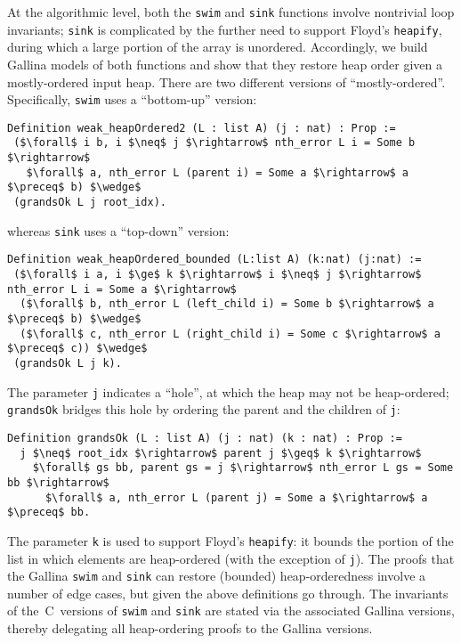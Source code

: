 At the algorithmic level, both the \texttt{swim} and \texttt{sink} functions involve nontrivial loop invariants; \texttt{sink} is complicated by the further need to support Floyd's \texttt{heapify}, during which a large portion of the array is unordered.  Accordingly, we build Gallina models of both functions and show that they restore heap order given a mostly-ordered input heap.  There are two different versions of ``mostly-ordered''. Specifically, \texttt{swim} uses a ``bottom-up'' version:
\begin{lstlisting}[firstnumber=5]
Definition weak_heapOrdered2 (L : list A) (j : nat) : Prop :=
 ($\forall$ i b, i $\neq$ j $\rightarrow$ nth_error L i = Some b $\rightarrow$
   $\forall$ a, nth_error L (parent i) = Some a $\rightarrow$ a $\preceq$ b) $\wedge$
 (grandsOk L j root_idx).
\end{lstlisting}
whereas \texttt{sink} uses a ``top-down'' version:
\begin{lstlisting}[firstnumber=last]
Definition weak_heapOrdered_bounded (L:list A) (k:nat) (j:nat) :=
 ($\forall$ i a, i $\ge$ k $\rightarrow$ i $\neq$ j $\rightarrow$ nth_error L i = Some a $\rightarrow$
  ($\forall$ b, nth_error L (left_child i) = Some b $\rightarrow$ a $\preceq$ b) $\wedge$
  ($\forall$ c, nth_error L (right_child i) = Some c $\rightarrow$ a $\preceq$ c)) $\wedge$
 (grandsOk L j k).
\end{lstlisting}
The parameter \texttt{j} indicates a ``hole'', at which the heap may not be heap-ordered; \texttt{grandsOk} bridges this hole by
ordering the parent and the children of \texttt{j}:
\begin{lstlisting}
Definition grandsOk (L : list A) (j : nat) (k : nat) : Prop :=
  j $\neq$ root_idx $\rightarrow$ parent j $\geq$ k $\rightarrow$
    $\forall$ gs bb, parent gs = j $\rightarrow$ nth_error L gs = Some bb $\rightarrow$
      $\forall$ a, nth_error L (parent j) = Some a $\rightarrow$ a $\preceq$ bb.
\end{lstlisting}
The parameter \texttt{k} is used to support Floyd's \texttt{heapify}: it bounds the portion of the list in which elements are heap-ordered (with the exception of \texttt{j}).  The proofs that the Gallina \texttt{swim} and \texttt{sink} can restore (bounded) heap-orderedness involve a number of edge cases, but given the above definitions go through.  The invariants of the~C~versions of \texttt{swim} and \texttt{sink} are stated via the associated
Gallina versions, thereby delegating all heap-ordering proofs to the Gallina versions.

